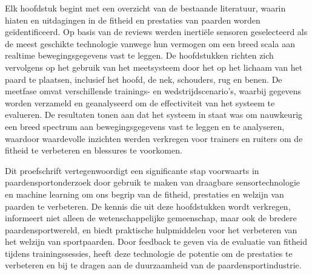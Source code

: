 Elk hoofdstuk begint met een overzicht van de bestaande literatuur, waarin hiaten en uitdagingen in de fitheid en prestaties van paarden worden geïdentificeerd. Op basis van de reviews werden inerti\"{e}le sensoren geselecteerd als de meest geschikte technologie vanwege hun vermogen om een breed scala aan realtime bewegingsgegevens vast te leggen. De hoofdstukken richten zich vervolgens op het gebruik van het meetsysteem door het op het lichaam van het paard te plaatsen, inclusief het hoofd, de nek, schouders, rug en benen. De meetfase omvat verschillende trainings- en wedstrijdscenario's, waarbij gegevens worden verzameld en geanalyseerd om de effectiviteit van het systeem te evalueren. De resultaten tonen aan dat het systeem in staat was om nauwkeurig een breed spectrum aan bewegingsgegevens vast te leggen en te analyseren, waardoor waardevolle inzichten werden verkregen voor trainers en ruiters om de fitheid te verbeteren en blessures te voorkomen.

Dit proefschrift vertegenwoordigt een significante stap voorwaarts in paardensportonderzoek door gebruik te maken van draagbare sensortechnologie en machine learning om ons begrip van de fitheid, prestaties en welzijn van paarden te verbeteren. De kennis die uit deze hoofdstukken wordt verkregen, informeert niet alleen de wetenschappelijke gemeenschap, maar ook de bredere paardensportwereld, en biedt praktische hulpmiddelen voor het verbeteren van het welzijn van sportpaarden. Door feedback te geven via de evaluatie van fitheid tijdens trainingssessies, heeft deze technologie de potentie om de prestaties te verbeteren en bij te dragen aan de duurzaamheid van de paardensportindustrie.